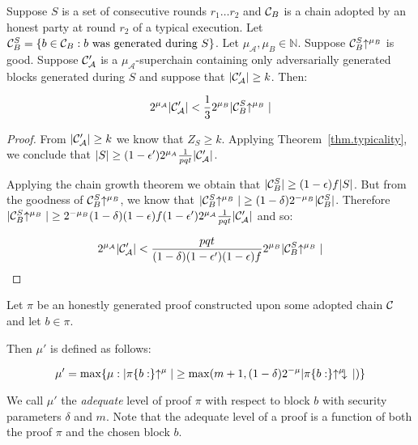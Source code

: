 \begin{lemma}\label{lem.level-comparison}
    Suppose $S$ is a set of consecutive rounds $r_1 \ldots r_2$
    and $\mathcal{C}_B$ is
    a chain adopted by an honest party at round $r_2$ of a typical execution.
    Let $\mathcal{C}_B^S = \{b \in
    \mathcal{C}_B: b \textnormal{ was generated during } S\}$. Let $\mu_\mathcal{A},
    \mu_B \in \mathbb{N}$. Suppose $\mathcal{C}_B^S\negthickspace\uparrow^{\mu_B}$ is good.
    Suppose $\mathcal{C}'_\mathcal{A}$ is a $\mu_\mathcal{A}$-superchain containing
    only adversarially generated blocks generated during $S$ and suppose that
    $|\mathcal{C}'_\mathcal{A}| \geq k$.
    Then:

    \begin{equation*}
    2^{\mu_\mathcal{A}}|\mathcal{C}'_\mathcal{A}| < \frac{1}{3}2^{\mu_B}|\mathcal{C}_B^S\negthickspace\uparrow^{\mu_B}|
    \end{equation*}
\end{lemma}
\begin{proof}
    From $|\mathcal{C}'_\mathcal{A}| \geq k$ we know that $Z_S \geq k$. Applying
    Theorem~\ref{thm.typicality}, we conclude that $|S| \geq (1 -
    \epsilon')2^{\mu_A}\frac{1}{pqt}|\mathcal{C}'_\mathcal{A}|$.

    Applying the chain growth theorem \cite{backbone} we obtain that $|\mathcal{C}_B^S|
    \geq (1 - \epsilon)f|S|$. But from the goodness of $\mathcal{C}_B^S\negthickspace\uparrow^{\mu_B}$, we
    know that $|\mathcal{C}_B^S\negthickspace\uparrow^{\mu_B}| \geq (1 -
    \delta)2^{-\mu_B}|\mathcal{C}_B^S|$. Therefore $|\mathcal{C}_B^S\negthickspace\uparrow^{\mu_B}| \geq
    2^{-\mu_B}(1 - \delta)(1 - \epsilon)f(1 -
    \epsilon')2^{\mu_\mathcal{A}}\frac{1}{pqt}|\mathcal{C}'_\mathcal{A}|$ and so:

    \begin{equation*}
    2^{\mu_\mathcal{A}}|\mathcal{C}'_\mathcal{A}|
    <
    \frac{pqt}{(1 - \delta)(1 -
    \epsilon')(1 - \epsilon)f}2^{\mu_B}|\mathcal{C}_B^S\negthickspace\uparrow^{\mu_B}|
    \end{equation*}
    \Qed
\end{proof}

\begin{definition}
Let $\pi$ be an honestly generated proof constructed upon some adopted chain
$\mathcal{C}$ and let $b \in \pi$.

Then $\mu'$ is defined as follows:

\begin{equation*}
\mu' = \max\{\mu: |\pi\{b:\}\negthickspace\uparrow^\mu| \geq \max(m + 1, (1 -
\delta)2^{-\mu}|\pi\{b:\}\negthickspace\uparrow^\mu\negthickspace\downarrow\,|)\}
\end{equation*}

We call $\mu'$ the \textit{adequate} level of proof $\pi$ with respect to
block $b$ with security parameters $\delta$ and $m$. Note that the adequate
level of a proof is a function of both the proof $\pi$ and the chosen block $b$.
\end{definition}

